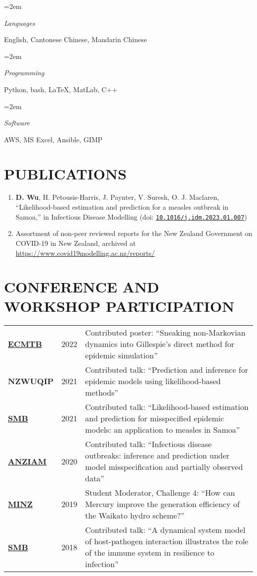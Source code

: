 \documentclass[paper=a4paper,fontsize=11pt]{scrartcl} %
\newlength{\spacebox}
\newcommand{\NewPart}[1]{\section*{\uppercase{#1}}}
\newcommand{\PersonalEntry}[2]{
		\noindent\hangindent=2em\hangafter=0 %
		\parbox{\spacebox}{        %
		\textit{#1}}		       %
		\hspace{1.5em} #2 \par}    %
\newcommand{\SkillsEntry}[2]{      %
		\noindent\hangindent=2em\hangafter=0 %
		\parbox{\spacebox}{        %
		\textit{#1}}			   %
		\hspace{1.5em} #2 \par}    %
\begin{document}

\SkillsEntry{Languages}{English, Cantonese Chinese, Mandarin Chinese}

\SkillsEntry{Programming}{Python, bash, \LaTeX, MatLab, C++}

\SkillsEntry{Software}{AWS, MS Excel, Ansible, GIMP}%

\NewPart{Publications}
\begin{enumerate}
    \item \textbf{D. Wu}, H. Petousis-Harris, J. Paynter, V. Suresh, O. J. Maclaren, ``Likelihood-based estimation and prediction for a measles outbreak in Samoa,'' in Infectious Disease Modelling (doi: \href{https://doi.org/10.1016/j.idm.2023.01.007}{\texttt{10.1016/j.idm.2023.01.007}})
    \item Assortment of non-peer reviewed reports for the New Zealand Government on COVID-19 in New Zealand, archived at \url{https://www.covid19modelling.ac.nz/reports/}
\end{enumerate}

\NewPart{Conference and Workshop Participation}
\begin{tabular}{p{\spacebox} p{0.5\spacebox} p{6.7\spacebox}}
\hyperlink{https://ecmtb2022.org/}{\textbf{ECMTB}} & {2022} & {Contributed poster: ``Sneaking non-Markovian dynamics into Gillespie's direct method for epidemic simulation''}\\
\textbf{NZWUQIP} & {2021} & {Contributed talk: ``Prediction and inference for epidemic models using likelihood-based methods''}\\
\hyperlink{https://www.smb2021.org/}{\textbf{SMB}} & {2021} & {Contributed talk: ``Likelihood-based  estimation and prediction for misspecified epidemic models: an application to measles in Samoa''}\\
\hyperlink{http://www.maths.mq.edu.au/ANZIAM2020/}{\textbf{ANZIAM}} & {2020} & {Contributed talk: ``Infectious disease outbreaks: inference and prediction under model misspecification and partially observed data''}\\
\hyperlink{https://minz.org.nz/2019/}{\textbf{MINZ}} & {2019} & {Student Moderator, Challenge 4: ``How can Mercury improve the generation efficiency of the Waikato hydro scheme?''}\\
\hyperlink{http://conferences.science.unsw.edu.au/SMB2018/}{\textbf{SMB}} & {2018} & {Contributed talk: ``A dynamical system model of host-pathogen interaction illustrates the role of the immune system in resilience to infection''}\\
\end{tabular}
\end{document}
